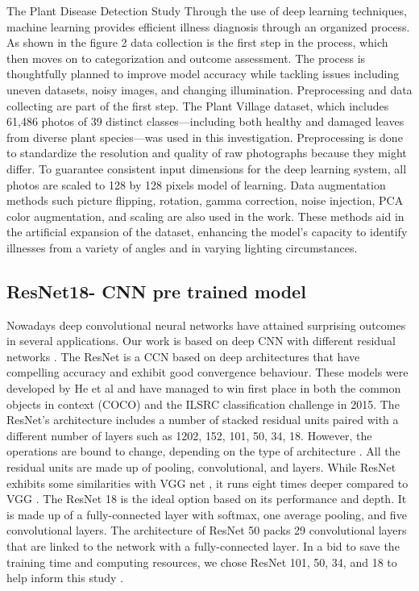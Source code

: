 \documentclass[conference]{IEEEtran}
\begin{document}
The Plant Disease Detection Study Through the use of deep learning techniques, machine learning provides efficient illness diagnosis through an organized process. As shown in the figure 2 data collection is the first step in the process, which then moves on to categorization and outcome assessment. The process is thoughtfully planned to improve model accuracy while tackling issues including uneven datasets, noisy images, and changing illumination.
Preprocessing and data collecting are part of the first step. The Plant Village dataset, which includes 61,486 photos of 39 distinct classes—including both healthy and damaged leaves from diverse plant species—was used in this investigation. Preprocessing is done to standardize the resolution and quality of raw photographs because they might differ. To guarantee consistent input dimensions for the deep learning system, all photos are scaled to 128 by 128 pixels model of learning. Data augmentation methods such picture flipping, rotation, gamma correction, noise injection, PCA color augmentation, and scaling are also used in the work. These methods aid in the artificial expansion of the dataset, enhancing the model's capacity to identify illnesses from a variety of angles and in varying lighting circumstances.

\subsection{\textbf{ResNet18- CNN pre trained model}}\label{AA}
Nowadays deep convolutional neural networks have attained surprising outcomes in several applications. Our work is based on deep CNN with different residual networks . The ResNet is a CCN based on deep architectures that have compelling accuracy and exhibit good convergence behaviour. These models were developed by He et al \cite{r8} and have managed to win first place in both the common objects in context (COCO) and the ILSRC classification challenge in 2015. The ResNet's architecture includes a number of stacked residual units paired with a different number of layers such as 1202, 152, 101, 50, 34, 18\cite{r9}. However, the operations are bound to change, depending on the type of architecture . All the residual units are made up of pooling, convolutional, and layers. While ResNet exhibits some similarities with VGG net , it runs eight times deeper compared to VGG . The ResNet 18 is the ideal option based on its performance and depth. It is made up of a fully-connected layer with softmax, one average pooling, and five convolutional layers. The architecture of ResNet 50 packs 29 convolutional layers that are linked to the network with a fully-connected layer. In a bid to save the training time and computing resources, we chose ResNet 101, 50, 34, and 18 to help inform this study .
\end{document}
